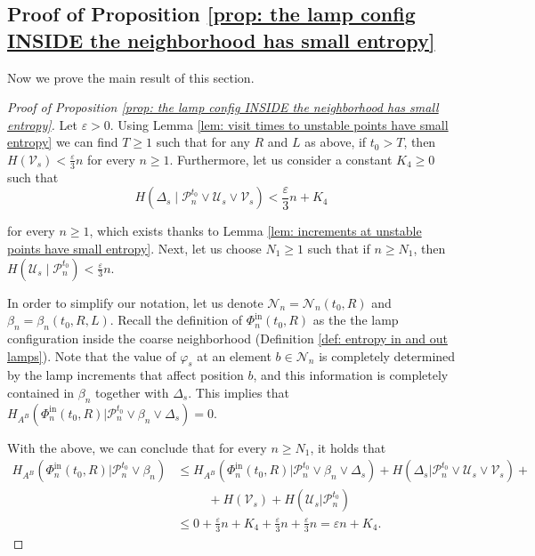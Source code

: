 \documentclass[reqno,oneside,11pt]{amsart}
\theoremstyle{plain}
\theoremstyle{definition}
\begin{document}
\subsection{Proof of Proposition \ref{prop: the lamp config INSIDE the neighborhood has small entropy}}\label{subsection: proof of LAMPS INSIDE}

Now we prove the main result of this section.

\begin{proof}[Proof of Proposition \ref{prop: the lamp config INSIDE the neighborhood has small entropy}]
	Let $\varepsilon>0$. Using Lemma \ref{lem: visit times to unstable points have small entropy} we can find $T\ge 1$ such that for any $R$ and $L$ as above, if $t_0>T$, then $H(\mathcal{V}_s)<\frac{\varepsilon}{3}n$ for every $n\ge 1$. Furthermore, let us consider a constant $K_4\ge 0$ such that
	\begin{equation*}
		H(\Delta_s \mid \mathcal{P}_n^{t_0}\vee \mathcal{U}_s\vee \mathcal{V}_s)<\frac{\varepsilon}{3} n +K_4
	\end{equation*}
	
	for every $n\ge 1$,	which exists thanks to Lemma \ref{lem: increments at unstable points have small entropy}.
	Next, let us choose $N_1\ge 1$ such that if $n\ge N_1$, then $H(\mathcal{U}_s\mid \mathcal{P}_n^{t_0})<\frac{\varepsilon}{3}n$.
	
	In order to simplify our notation, let us denote $\mathcal{N}_n=\mathcal{N}_n(t_0,R)$ and $\beta_n=\beta_n(t_0,R,L)$. Recall the definition of $\Phi_{n}^{\mathrm{in}}(t_0,R)$ as the the lamp configuration inside the coarse neighborhood (Definition \ref{def: entropy in and out lamps}). Note that the value of $\varphi_s$ at an element $b\in \mathcal{N}_n$ is completely determined by the lamp increments that affect position $b$, and this information is completely contained in $\beta_n$ together with $\Delta_s$. This implies that $		H_{A^{B}}\left(\Phi_{n}^{\mathrm{in}}(t_0,R)\Big|\mathcal{P}_n^{t_0}\vee \beta_n\vee \Delta_s\right)=0.$
	
	With the above, we can conclude that for every $n\ge N_1$, it holds that
	\begin{align*}
		H_{A^{B}}\left(\Phi_{n}^{\mathrm{in}}(t_0,R)\Big| \mathcal{P}_n^{t_0}\vee \beta_n\right)&\le H_{A^{B}}\left(\Phi_{n}^{\mathrm{in}}(t_0,R)\Big|\mathcal{P}_n^{t_0}\vee \beta_n\vee \Delta_s\right)+H\left(\Delta_s\Big| \mathcal{P}_n^{t_0}\vee \mathcal{U}_s\vee \mathcal{V}_s\right)+\\&\hspace{30pt}+H\left(\mathcal{V}_s\right)+H\left(\mathcal{U}_s\Big| \mathcal{P}_n^{t_0}\right) \\
		&\le 0 + \frac{\varepsilon}{3} n +K_4 +\frac{\varepsilon}{3} n + \frac{\varepsilon}{3} n=\varepsilon n +K_4.
	\end{align*}
\end{proof}
\end{document}
